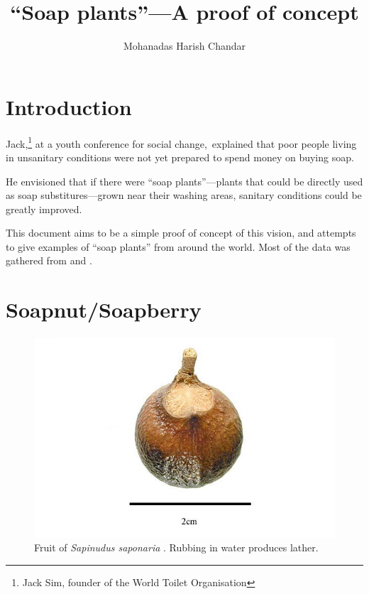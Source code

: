 \documentclass[a4paper]{article}
\title{``Soap plants''---A proof of concept}
\author{Mohanadas Harish Chandar}
\begin{document}
\maketitle
\section*{Introduction}
Jack,\footnote{Jack Sim, founder of the World Toilet Organisation} 
at a youth conference for social change,\footnotemark\ explained that 
poor people living in unsanitary conditions were not yet prepared to 
spend money on buying soap.


He envisioned that if there were ``soap plants''---plants that could be 
directly used as soap substitures---grown near their washing areas,
sanitary conditions could be greatly improved.

This document aims to be a simple proof of concept of this vision,
and attempts to give examples of ``soap plants'' from around the world.
Most of the data was gathered from \citep{PFAF} and \citep{USDA}.

\section{Soapnut/Soapberry}
\begin{figure}[H]
\centering
\includegraphics{images/sapindus_saponaria_fruit}
\caption{Fruit of {\it Sapinudus saponaria} \citep{Gibbons2006}.
         Rubbing in water produces lather.} 
\end{figure}
\end{document}
